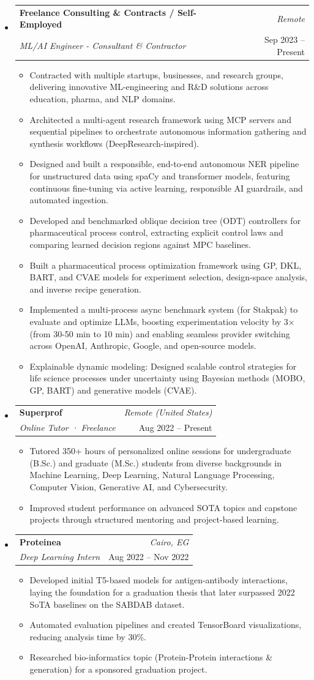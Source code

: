\documentclass[10pt, letterpaper]{extarticle}
\makeatletter
\newcommand{\resumeItem}[1]{\item{#1}}
\newcommand{\resumeSubheading}[4]{
  \item
    \begin{tabular*}{1.0\textwidth}[t]{l@{\extracolsep{\fill}}r}
      \textbf{#1} & \textit{#4} \\
      \textit{#3} & #2 \\
    \end{tabular*}\vspace{1.5pt}
}
\makeatother
\begin{document}
\begin{itemize}[label={}, leftmargin=0in]
\newpage
    \resumeSubheading{Freelance Consulting \& Contracts / Self-Employed}{Sep 2023 – Present}{ML/AI Engineer - Consultant \& Contractor}{Remote}
    \begin{itemize}[label={--}]
      \resumeItem{Contracted with multiple startups, businesses, and research groups, delivering innovative ML-engineering and R\&D solutions across education, pharma, and NLP domains.}
      \resumeItem{Architected a multi-agent research framework using MCP servers and sequential pipelines to orchestrate autonomous information gathering and synthesis workflows (DeepResearch-inspired).}
      \resumeItem{Designed and built a responsible, end-to-end autonomous NER pipeline for unstructured data using spaCy and transformer models, featuring continuous fine-tuning via active learning, responsible AI guardrails, and automated ingestion.}
      \resumeItem{Developed and benchmarked oblique decision tree (ODT) controllers for pharmaceutical process control, extracting explicit control laws and comparing learned decision regions against MPC baselines.}
      \resumeItem{Built a pharmaceutical process optimization framework using GP, DKL, BART, and CVAE models for experiment selection, design-space analysis, and inverse recipe generation.}
      \resumeItem{Implemented a multi-process async benchmark system (for Stakpak) to evaluate and optimize LLMs, boosting experimentation velocity by 3× (from 30-50 min to 10 min) and enabling seamless provider switching across OpenAI, Anthropic, Google, and open-source models.}
      \resumeItem{Explainable dynamic modeling: Designed scalable control strategies for life science processes under uncertainty using Bayesian methods (MOBO, GP, BART) and generative models (CVAE).}
    \end{itemize}

    \resumeSubheading{Superprof}{Aug 2022 – Present}{Online Tutor · Freelance}{Remote (United States)}
    \begin{itemize}[label={--}]
      \resumeItem{Tutored 350+ hours of personalized online sessions for undergraduate (B.Sc.) and graduate (M.Sc.) students from diverse backgrounds in Machine Learning, Deep Learning, Natural Language Processing, Computer Vision, Generative AI, and Cybersecurity.}
      \resumeItem{Improved student performance on advanced SOTA topics and capstone projects through structured mentoring and project-based learning.}
    \end{itemize}

    \resumeSubheading{Proteinea}{Aug 2022 – Nov 2022}{Deep Learning Intern}{Cairo, EG}
    \begin{itemize}[label={--}]
      \resumeItem{Developed initial T5-based models for antigen-antibody interactions, laying the foundation for a graduation thesis that later surpassed 2022 SoTA baselines on the SABDAB dataset.}
      \resumeItem{Automated evaluation pipelines and created TensorBoard visualizations, reducing analysis time by 30\%.}
      \resumeItem{Researched bio-informatics topic (Protein-Protein interactions \& generation) for a sponsored graduation project.}
    \end{itemize}

\end{itemize}
\end{document}
